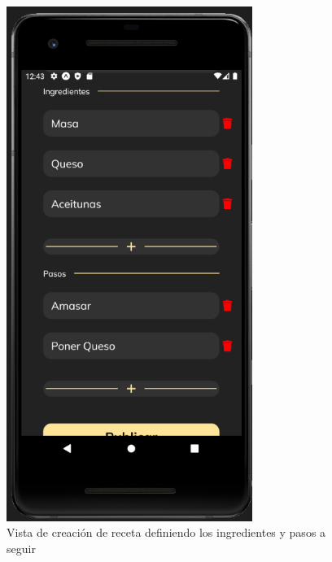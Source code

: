 \begin{figure}[!h]
  \centering
  \includegraphics[width=8cm, scale=1]{Images/Imagenes/add6.png}
  \caption{Vista de creación de receta definiendo los ingredientes y pasos a seguir}
  \label{fig:add6}
\end{figure}

